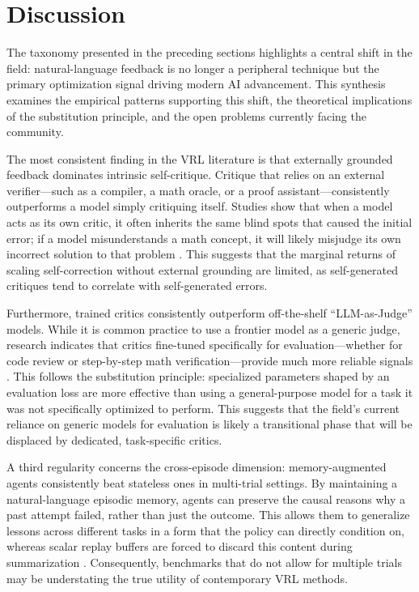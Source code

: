 \section{Discussion}
\label{sec:discussion}

The taxonomy presented in the preceding sections highlights a central shift in the field: natural-language feedback is no longer a peripheral technique but the primary optimization signal driving modern AI advancement. This synthesis examines the empirical patterns supporting this shift, the theoretical implications of the substitution principle, and the open problems currently facing the community.

The most consistent finding in the VRL literature is that externally grounded feedback dominates intrinsic self-critique. Critique that relies on an external verifier—such as a compiler, a math oracle, or a proof assistant—consistently outperforms a model simply critiquing itself. Studies show that when a model acts as its own critic, it often inherits the same blind spots that caused the initial error; if a model misunderstands a math concept, it will likely misjudge its own incorrect solution to that problem \citep{gou2024critic, first2023baldur}. This suggests that the marginal returns of scaling self-correction without external grounding are limited, as self-generated critiques tend to correlate with self-generated errors.

Furthermore, trained critics consistently outperform off-the-shelf ``LLM-as-Judge'' models. While it is common practice to use a frontier model as a generic judge, research indicates that critics fine-tuned specifically for evaluation—whether for code review or step-by-step math verification—provide much more reliable signals \citep{mcaleese2024criticgpt, zhao2025genprm}. This follows the substitution principle: specialized parameters shaped by an evaluation loss are more effective than using a general-purpose model for a task it was not specifically optimized to perform. This suggests that the field's current reliance on generic models for evaluation is likely a transitional phase that will be displaced by dedicated, task-specific critics.

A third regularity concerns the cross-episode dimension: memory-augmented agents consistently beat stateless ones in multi-trial settings. By maintaining a natural-language episodic memory, agents can preserve the causal reasons why a past attempt failed, rather than just the outcome. This allows them to generalize lessons across different tasks in a form that the policy can directly condition on, whereas scalar replay buffers are forced to discard this content during summarization \citep{shinn2023reflexion, suzgun2026dynamic}. Consequently, benchmarks that do not allow for multiple trials may be understating the true utility of contemporary VRL methods.

